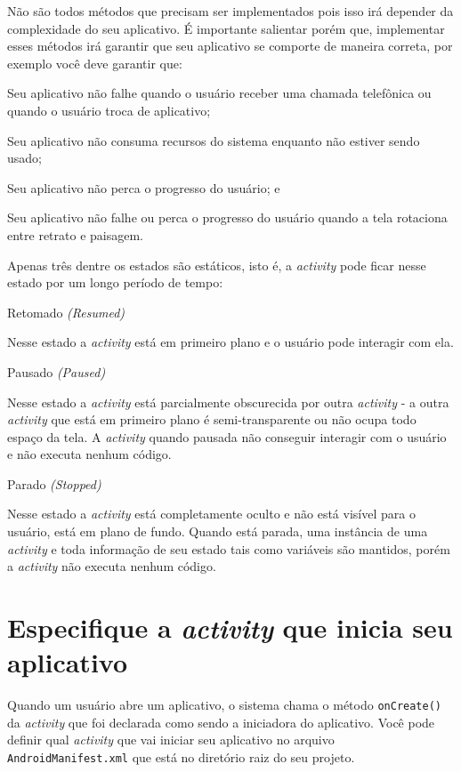 \documentclass[a4paper,12pt,brazil,oneside]{book}
\begin{document}
\begin{singlespace}
 Não são todos métodos que precisam ser implementados pois isso irá depender da complexidade do seu aplicativo. É importante salientar porém que, implementar esses métodos irá garantir que seu aplicativo se comporte de maneira correta, por exemplo você deve garantir que:
 \bi
 \item Seu aplicativo não falhe quando o usuário receber uma chamada telefônica ou quando o usuário troca de aplicativo;
 \item Seu aplicativo não consuma recursos do sistema enquanto não estiver sendo usado;
 \item Seu aplicativo não perca o progresso do usuário; e
 \item Seu aplicativo não falhe ou perca o progresso do usuário quando a tela rotaciona entre retrato e paisagem.
\ei

Apenas três dentre os estados são estáticos, isto é, a \emph{activity} pode ficar nesse estado por um longo período de tempo:


Retomado \emph{(Resumed)}
	
\hspace*{5mm} Nesse estado a \emph{activity} está em primeiro plano e o usuário pode interagir com ela.
	
Pausado \emph{(Paused)}
	
\hspace*{5mm} Nesse estado a \emph{activity} está parcialmente obscurecida por outra \emph{activity} - a outra \emph{activity} que está em primeiro plano é semi-transparente ou não ocupa todo espaço da tela. A \emph{activity} quando pausada não conseguir interagir com o usuário e não executa nenhum código.
	
Parado \emph{(Stopped)}
	
\hspace*{5mm} Nesse estado a \emph{activity} está completamente oculto e não está visível para o usuário, está em plano de fundo. Quando está parada, uma instância de uma \emph{activity} e toda informação de seu estado tais como variáveis são mantidos, porém a \emph{activity} não executa nenhum código.
	
\section{Especifique a \emph{activity} que inicia seu aplicativo}
\label{sec:especact}

Quando um usuário abre um aplicativo, o sistema chama o método \texttt{onCreate()} da \emph{activity} que foi declarada como sendo a iniciadora do aplicativo. Você pode definir qual \emph{activity} que vai iniciar seu aplicativo no arquivo \texttt{AndroidManifest.xml} que está no diretório raiz do seu projeto.


\end{singlespace}
\end{document}
